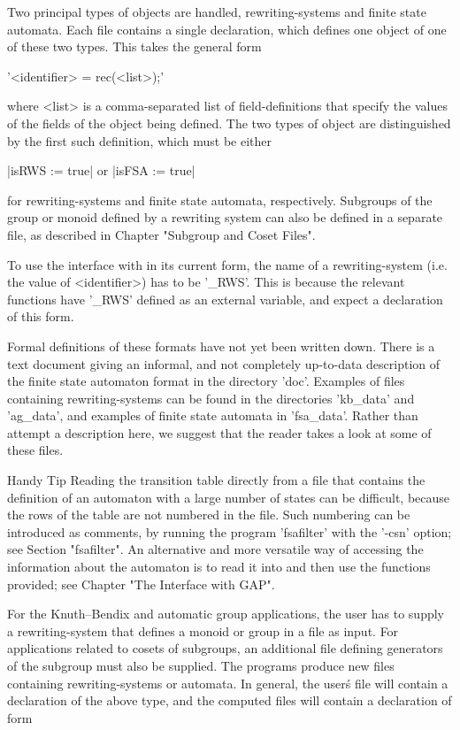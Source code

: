Two principal types of objects are handled, rewriting-systems and
finite state automata. Each file contains a single {\GAP} declaration, which
defines one object of one of these two types. This takes the general form

'<identifier> \:= rec(<list>);'

where <list> is a comma-separated list
of field-definitions that specify the values of the fields of the object
being defined. The two types of object are distinguished by the first
such definition, which must be either

|isRWS := true| \hspace{1cm}  or \hspace{1cm}  |isFSA := true|

for rewriting-systems and finite state automata, respectively.
Subgroups of the group or monoid defined by a rewriting system can also be
defined in a separate file, as described in Chapter
"Subgroup and Coset Files".

To use the interface with {\GAP} in its current form, the name of a
rewriting-system (i.e. the value of <identifier>) has to be '\_RWS'.
This is because the relevant {\GAP} functions have '\_RWS' defined as an
external variable, and expect a declaration of this form.

Formal definitions of these formats have not yet been written down.
There is a text document giving an informal, and not completely up-to-data
description of the finite state automaton format in the {\KBMAG}
directory 'doc'. Examples of files containing rewriting-systems can be
found in the directories 'kb\_data' and 'ag\_data', and examples of
finite state automata in 'fsa\_data'. Rather than attempt a description
here, we suggest that the reader takes a look at some of these files.

{\sf Handy Tip\:} Reading the transition table directly from a file that
contains the definition of an automaton with a large number of states
can be difficult, because the rows of the table are not numbered in the
file. Such numbering can be introduced as comments, by running the
program 'fsafilter' with the '-csn' option; see Section "fsafilter".
An alternative and more versatile way of accessing the information
about the automaton is to read it into {\GAP} and then use the {\GAP}
functions provided; see Chapter "The Interface with GAP".

For the Knuth--Bendix and automatic group applications, the user has to
supply a rewriting-system that defines a monoid or group in a file as input.
For applications related to cosets of subgroups, an additional file
defining generators of the subgroup must also be supplied.
The programs produce new files containing rewriting-systems or automata.
In general, the user\'s file will contain a declaration of the above type,
and the computed files will contain a declaration of form

